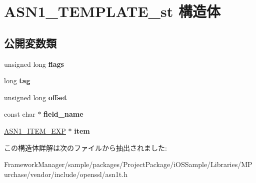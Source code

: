 \hypertarget{struct_a_s_n1___t_e_m_p_l_a_t_e__st}{}\section{A\+S\+N1\+\_\+\+T\+E\+M\+P\+L\+A\+T\+E\+\_\+st 構造体}
\label{struct_a_s_n1___t_e_m_p_l_a_t_e__st}
\subsection*{公開変数類}
\begin{DoxyCompactItemize}
\item 
\hypertarget{struct_a_s_n1___t_e_m_p_l_a_t_e__st_aadbe8b5ea9d41920c3fc59d6c65848a8}{}unsigned long {\bfseries flags}\label{struct_a_s_n1___t_e_m_p_l_a_t_e__st_aadbe8b5ea9d41920c3fc59d6c65848a8}

\item 
\hypertarget{struct_a_s_n1___t_e_m_p_l_a_t_e__st_a8ef37d4a92684f1305627489e11a6b2e}{}long {\bfseries tag}\label{struct_a_s_n1___t_e_m_p_l_a_t_e__st_a8ef37d4a92684f1305627489e11a6b2e}

\item 
\hypertarget{struct_a_s_n1___t_e_m_p_l_a_t_e__st_a6fed94625b157be3f3513fda21ae464f}{}unsigned long {\bfseries offset}\label{struct_a_s_n1___t_e_m_p_l_a_t_e__st_a6fed94625b157be3f3513fda21ae464f}

\item 
\hypertarget{struct_a_s_n1___t_e_m_p_l_a_t_e__st_af497df5141e17637e18b4857c147ca73}{}const char $\ast$ {\bfseries field\+\_\+name}\label{struct_a_s_n1___t_e_m_p_l_a_t_e__st_af497df5141e17637e18b4857c147ca73}

\item 
\hypertarget{struct_a_s_n1___t_e_m_p_l_a_t_e__st_a1f27bffc57ff2163fb587c3da0cf1f9e}{}\hyperlink{struct_a_s_n1___i_t_e_m__st}{A\+S\+N1\+\_\+\+I\+T\+E\+M\+\_\+\+E\+X\+P} $\ast$ {\bfseries item}\label{struct_a_s_n1___t_e_m_p_l_a_t_e__st_a1f27bffc57ff2163fb587c3da0cf1f9e}

\end{DoxyCompactItemize}


この構造体詳解は次のファイルから抽出されました\+:\begin{DoxyCompactItemize}
\item 
Framework\+Manager/sample/packages/\+Project\+Package/i\+O\+S\+Sample/\+Libraries/\+M\+Purchase/vendor/include/openssl/asn1t.\+h\end{DoxyCompactItemize}
